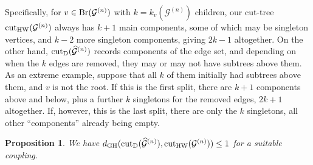\documentclass[11pt,a4paper]{article}
\newtheorem{prop}{Proposition}[section]
\newcommand{\cG}{\mathcal{G}}
\newcommand{\modcut}{{\rm cut}_{\rm HW}}
\begin{document}
Specifically, for
$v\in{\rm Br}(\cG^{(n)})$ with $k=k_v(\cG^{(n)})$ children, our cut-tree $\modcut(\cG^{(n)})$ always has $k+1$ main components, some of which may be singleton vertices,
and $k-2$ more singleton components, giving $2k-1$ altogether. On the other hand, ${\rm cut}_{\rm D}(\widehat{\cG}^{(n)})$ records components of the edge set, and
depending on when the $k$ edges are removed, they may or may not have subtrees above them. As an extreme example, suppose that all $k$ of them
initially had subtrees above them, and $v$ is not the root. If this is the first split, there are $k+1$ components above and below, plus a further $k$ singletons for the
removed edges, $2k+1$ altogether. If, however, this is the last split, there are only the $k$ singletons, all other ``components'' already being empty.

\begin{prop}\label{propcut}  We have $d_{\rm GH}({\rm cut}_{\rm D}(\widehat{\cG}^{(n)}),\modcut(\cG^{(n)}))\le 1$ for a suitable coupling.
\end{prop}
\end{document}
